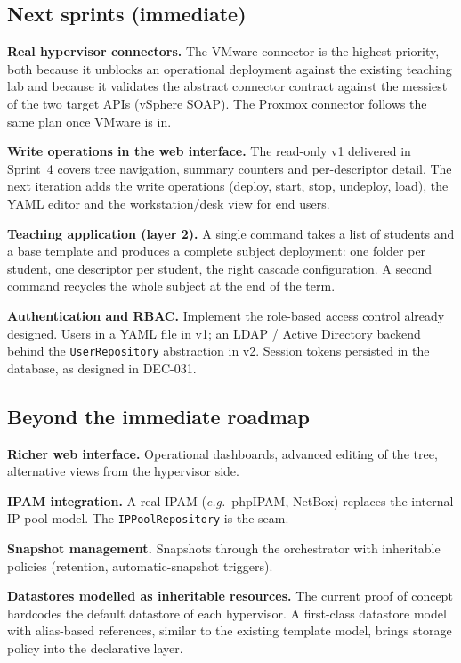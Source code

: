 \subsection{Next sprints (immediate)}

\textbf{Real hypervisor connectors.} The VMware connector is the
highest priority, both because it unblocks an operational deployment
against the existing teaching lab and because it validates the
abstract connector contract against the messiest of the two target
APIs (vSphere SOAP). The Proxmox connector follows the same plan
once VMware is in.

\textbf{Write operations in the web interface.} The read-only
v1 delivered in Sprint~4 covers tree navigation, summary counters
and per-descriptor detail. The next iteration adds the write
operations (deploy, start, stop, undeploy, load), the YAML editor
and the workstation/desk view for end users.

\textbf{Teaching application (layer 2).} A single command takes a
list of students and a base template and produces a complete
subject deployment: one folder per student, one descriptor per
student, the right cascade configuration. A second command recycles
the whole subject at the end of the term.

\textbf{Authentication and RBAC.} Implement the role-based access
control already designed. Users in a YAML file in v1; an LDAP /
Active Directory backend behind the \texttt{UserRepository}
abstraction in v2. Session tokens persisted in the database, as
designed in DEC-031.

\subsection{Beyond the immediate roadmap}

\textbf{Richer web interface.} Operational dashboards, advanced
editing of the tree, alternative views from the hypervisor side.

\textbf{IPAM integration.} A real IPAM (\emph{e.g.}\ phpIPAM,
NetBox) replaces the internal IP-pool model. The
\texttt{IPPoolRepository} is the seam.

\textbf{Snapshot management.} Snapshots through the orchestrator
with inheritable policies (retention, automatic-snapshot triggers).

\textbf{Datastores modelled as inheritable resources.} The current
proof of concept hardcodes the default datastore of each
hypervisor. A first-class datastore model with alias-based
references, similar to the existing template model, brings storage
policy into the declarative layer.

